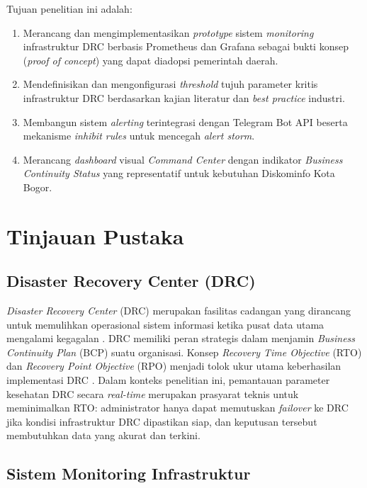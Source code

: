 \documentclass[10pt,twocolumn]{article}
\begin{document}
Tujuan penelitian ini adalah:
\begin{enumerate}[leftmargin=*, label=\arabic*.]
  \item Merancang dan mengimplementasikan \textit{prototype} sistem \textit{monitoring} infrastruktur
        DRC berbasis Prometheus dan Grafana sebagai bukti konsep (\textit{proof of concept}) yang
        dapat diadopsi pemerintah daerah.
  \item Mendefinisikan dan mengonfigurasi \textit{threshold} tujuh parameter kritis infrastruktur DRC
        berdasarkan kajian literatur dan \textit{best practice} industri.
  \item Membangun sistem \textit{alerting} terintegrasi dengan Telegram Bot API beserta mekanisme
        \textit{inhibit rules} untuk mencegah \textit{alert storm}.
  \item Merancang \textit{dashboard} visual \textit{Command Center} dengan indikator
        \textit{Business Continuity Status} yang representatif untuk kebutuhan Diskominfo Kota Bogor.
\end{enumerate}

\section{Tinjauan Pustaka}

\subsection{Disaster Recovery Center (DRC)}

\textit{Disaster Recovery Center} (DRC) merupakan fasilitas cadangan yang dirancang untuk memulihkan
operasional sistem informasi ketika pusat data utama mengalami kegagalan \cite{bssn2021}. DRC memiliki
peran strategis dalam menjamin \textit{Business Continuity Plan} (BCP) suatu organisasi. Konsep
\textit{Recovery Time Objective} (RTO) dan \textit{Recovery Point Objective} (RPO) menjadi tolok ukur
utama keberhasilan implementasi DRC \cite{kominfo2020}. Dalam konteks penelitian ini, pemantauan
parameter kesehatan DRC secara \textit{real-time} merupakan prasyarat teknis untuk meminimalkan RTO:
administrator hanya dapat memutuskan \textit{failover} ke DRC jika kondisi infrastruktur DRC dipastikan
siap, dan keputusan tersebut membutuhkan data yang akurat dan terkini.

\subsection{Sistem Monitoring Infrastruktur}
\end{document}
